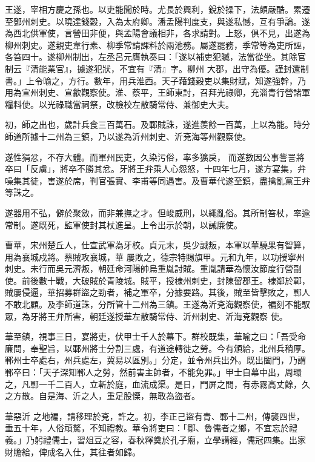 \begin{pinyinscope}
 王遂，宰相方慶之孫也。以吏能聞於時。尤長於興利，銳於操下，法頗嚴酷。累遷至鄧州刺史。以曉達錢穀，入為太府卿。潘孟陽判度支，與遂私憾，互有爭論。遂為西北供軍使，言營田非便，與孟陽會議相非，各求請對。上怒，俱不見，出遂為柳州刺史。遂親吏韋行素、柳季常請課料於兩池務。屬遂罷務，季常等為吏所誣，各笞四十。遂柳州制出，左丞呂元膺執奏曰：「遂以補吏犯贓，法當從坐。其除官制云『清能業官』，據遂犯狀，不宜有『清』字。柳州
 大郡，出守為優。謹封還制書。」上令喻之，方行。數年，用兵淮西。天子藉錢穀吏以集財賦，知遂強幹，乃用為宣州刺史、宣歙觀察使。淮、蔡平，王師東討，召拜光祿卿，充淄青行營諸軍糧料使。以光祿職當祠祭，改檢校左散騎常侍、兼御史大夫。



 初，師之出也，歲計兵食三百萬石。及鄆賊誅，遂進羨餘一百萬，上以為能。時分師道所據十二州為三鎮，乃以遂為沂州刺史、沂兗海等州觀察使。



 遂性狷忿，不存大體。而軍州民吏，久染污俗，率多獷戾，
 而遂數因公事訾詈將卒曰「反虜」，將卒不勝其忿。牙將王弁乘人心怨怒，十四年七月，遂方宴集，弁噪集其徒，害遂於席，判官張實、李甫等同遇害。及曹華代遂至鎮，盡擒亂黨王弁等誅之。



 遂器用不弘，僻於聚斂，而非兼撫之才。但峻威刑，以繩亂俗。其所制笞杖，率逾常制。遂既死，監軍使封其杖進呈。上令出示於朝，以誡廉使。



 曹華，宋州楚丘人，仕宣武軍為牙校。貞元末，吳少誠叛，本軍以華驍果有智算，用為襄城戍將。蔡賊攻襄城，華
 屢敗之，德宗特賜旗甲。元和九年，以功授寧州刺史。未行而吳元濟叛，朝廷命河陽帥烏重胤討賊。重胤請華為懷汝節度行營副使。前後數十戰，大破賊於青陵城。賊平，授棣州刺史，封陳留郡王。棣鄰於鄆，賊屢侵逼，華招募群盜之勁者，補之軍卒，分據要路。其後，賊至皆擊敗之，鄆人不敢北顧。及李師道誅，分所管十二州為三鎮。王遂為沂兗海觀察使，褊刻不能馭眾，為牙將王弁所害，朝廷遂授華左散騎常侍、沂州刺史、沂海兗觀察
 使。



 華至鎮，視事三日，宴將吏，伏甲士千人於幕下。群校既集，華喻之曰：「吾受命廉問，奉聖旨，以鄆州將士分割三處，有道途轉徙之勞。今有頒給，北州兵稍厚。鄆州士卒處右，州兵處左，冀易以區別。」分定，並令州兵出外。既出闔門，乃謂鄆卒曰：「天子深知鄆人之勞，然前害主帥者，不能免罪。」甲士自幕中出，周環之，凡鄆一千二百人，立斬於庭，血流成渠。是日，門屏之間，有赤霧高丈餘，久之方散。自是海、沂之人，重足股慄，無敢為盜者。



 華惡沂
 之地褊，請移理於兗，許之。初，李正己盜有青、鄆十二州，傳襲四世，垂五十年，人俗頑驁，不知禮教。華令將吏曰：「鄒、魯儒者之鄉，不宜忘於禮義。」乃躬禮儒士，習俎豆之容，春秋釋奠於孔子廟，立學講經，儒冠四集。出家財贍給，俾成名入仕，其往者如歸。




\end{pinyinscope}
